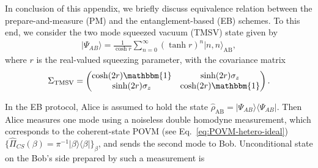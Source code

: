 \documentclass[%
reprint,
superscriptaddress,
 amsmath,amssymb,amsfonts,
 aps,
 pra,
 longbibliography
]{revtex4-2}
\newcommand{\ket}[1]{\ensuremath{|{#1}\rangle}}
\newcommand{\bra}[1]{\ensuremath{\langle{#1}|}}
\newcommand{\ind}[1]{\mathrm{#1}}
\begin{document}
In conclusion of this appendix, we briefly discuss
equivalence relation between the
prepare-and-measure (PM) and the entanglement-based (EB) schemes.
To this end,
we consider the two mode squeezed vacuum (TMSV) state
given by~\cite{Weed:rmp:2012}
\begin{align}
  \label{eq:psi_AB}
  \ket{\Psi_{AB}}=\frac{1}{\cosh r}\sum_{n=0}^{\infty}(\tanh r)^n\ket{n,n}_{\ind{AB}},
\end{align}
where $r$ is the real-valued squeezing parameter,
with the covariance matrix~\cite{Serafini:bk:2023}
\begin{align}
  \label{eq:cov_TMSV}
  &\quad
    \Sigma_{\ind{TMSV}}
  =
  \begin{pmatrix}
        \cosh(2r)\mathbbm{1}&\sinh(2r)\sigma_z\\
        \sinh(2r)\sigma_z&\cosh(2r)\mathbbm{1}
    \end{pmatrix}.
\end{align}



In
the EB protocol,
Alice is assumed to hold the state
$\hat{\rho}_{\ind{AB}}=\ket{\Psi_{AB}}\bra{\Psi_{AB}}$.
Then Alice measures one mode using a noiseless double homodyne measurement,
which corresponds to the coherent-state POVM (see Eq.~\eqref{eq:POVM-hetero-ideal})
$\{\hat\Pi_{CS}(\beta)=\pi^{-1}\ket{\beta}\bra{\beta}\}_{\beta}$,
and sends the second mode to Bob.
Unconditional state on the  Bob's side
prepared by such a measurement 
is
\end{document}
